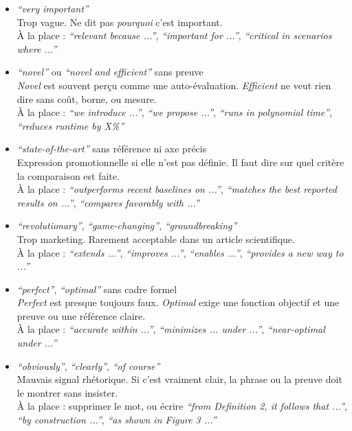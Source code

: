 \documentclass[11pt,a4paper]{article}
\theoremstyle{definition}
\begin{document}
\begin{itemize}

    \item \textit{``very important''} \\
    Trop vague. Ne dit pas \emph{pourquoi} c'est important. \\
    À la place : \textit{``relevant because ...''}, \textit{``important for ...''}, \textit{``critical in scenarios where ...''}

    \item \textit{``novel''} ou \textit{``novel and efficient''} sans preuve \\
    \textit{Novel} est souvent perçu comme une auto-évaluation. \textit{Efficient} ne veut rien dire sans coût, borne, ou mesure. \\
    À la place : \textit{``we introduce ...''}, \textit{``we propose ...''}, \textit{``runs in polynomial time''}, \textit{``reduces runtime by X\%''}

    \item \textit{``state-of-the-art''} sans référence ni axe précis \\
    Expression promotionnelle si elle n'est pas définie. Il faut dire sur quel critère la comparaison est faite. \\
    À la place : \textit{``outperforms recent baselines on ...''}, \textit{``matches the best reported results on ...''}, \textit{``compares favorably with ...''}

    \item \textit{``revolutionary''}, \textit{``game-changing''}, \textit{``groundbreaking''} \\
    Trop marketing. Rarement acceptable dans un article scientifique. \\
    À la place : \textit{``extends ...''}, \textit{``improves ...''}, \textit{``enables ...''}, \textit{``provides a new way to ...''}

    \item \textit{``perfect''}, \textit{``optimal''} sans cadre formel \\
    \textit{Perfect} est presque toujours faux. \textit{Optimal} exige une fonction objectif et une preuve ou une référence claire. \\
    À la place : \textit{``accurate within ...''}, \textit{``minimizes ... under ...''}, \textit{``near-optimal under ...''}

    \item \textit{``obviously''}, \textit{``clearly''}, \textit{``of course''} \\
    Mauvais signal rhétorique. Si c'est vraiment clair, la phrase ou la preuve doit le montrer sans insister. \\
    À la place : supprimer le mot, ou écrire \textit{``from Definition 2, it follows that ...''}, \textit{``by construction ...''}, \textit{``as shown in Figure 3 ...''}


\end{itemize}
\end{document}
